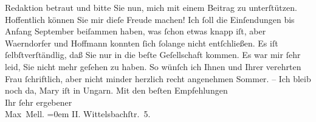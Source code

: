 \begin{ledgroupsized}[t]{13cm}
               Redaktion betraut und bitte Sie nun, mich mit einem Beitrag zu unterſtützen.
               Hoffentlich können Sie mir dieſe Freude machen! Ich ſoll die Einſendungen bis Anfang
               September beiſammen haben, was ſchon etwas knapp iſt, aber Waerndorfer und Hoffmann konnten ſich ſolange nicht entſchließen. Es iſt ſelbſtverſtändlig,
               daß Sie nur in die beſte Geſellschaft kommen.\pend
           \pstart
           Es war mir ſehr leid, Sie nicht mehr geſehen zu haben. So wünſch ich Ihnen und Ihrer
               verehrten Frau ſchriftlich,
               aber nicht minder herzlich recht angenehmen Sommer. – Ich bleib noch da, Mary iſt in Ungarn.\pend
           \pstart
           Mit den beſten Empfehlungen{\\[\baselineskip]}Ihr ſehr ergebener{\\[\baselineskip]}\spacefill\mbox{Max Mell.}\pend
           \leftskip=0em{}\pstart
           II. Wittelsbachſtr. 5.\pend
           
         
         \endnumbering{}\end{ledgroupsized}  \newcommand{\dateiname}{L01692}\newcommand{\titel}{Max Mell an Arthur Schnitzler, 15. 7. 1907}\newcommand{\editorInnen}{Martin Anton Müller und Gerd-Hermann Susen}
      